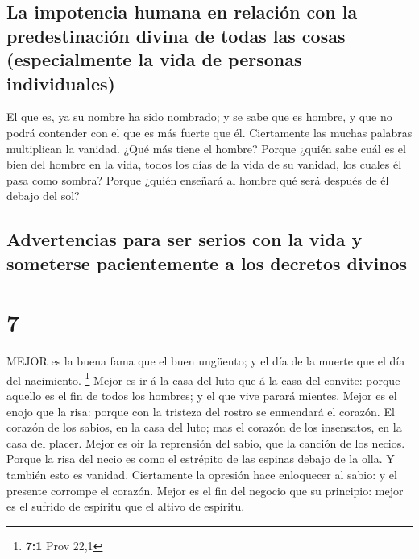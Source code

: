 \hypertarget{la-impotencia-humana-en-relaciuxf3n-con-la-predestinaciuxf3n-divina-de-todas-las-cosas-especialmente-la-vida-de-personas-individuales}{%
\subsection{La impotencia humana en relación con la predestinación
divina de todas las cosas (especialmente la vida de personas
individuales)}\label{la-impotencia-humana-en-relaciuxf3n-con-la-predestinaciuxf3n-divina-de-todas-las-cosas-especialmente-la-vida-de-personas-individuales}}

 El que es, ya su nombre ha sido nombrado; y se sabe que es
hombre, y que no podrá contender con el que es más fuerte que él.
 Ciertamente las muchas palabras multiplican la vanidad.
¿Qué más tiene el hombre?  Porque ¿quién sabe cuál es el
bien del hombre en la vida, todos los días de la vida de su vanidad, los
cuales él pasa como sombra? Porque ¿quién enseñará al hombre qué será
después de él debajo del sol?

\hypertarget{advertencias-para-ser-serios-con-la-vida-y-someterse-pacientemente-a-los-decretos-divinos}{%
\subsection{Advertencias para ser serios con la vida y someterse
pacientemente a los decretos
divinos}\label{advertencias-para-ser-serios-con-la-vida-y-someterse-pacientemente-a-los-decretos-divinos}}

\hypertarget{section-6}{%
\section{7}\label{section-6}}

 MEJOR es la buena fama que el buen ungüento; y el día de la
muerte que el día del nacimiento. \footnote{\textbf{7:1} Prov 22,1}
 Mejor es ir á la casa del luto que á la casa del convite:
porque aquello es el fin de todos los hombres; y el que vive parará
mientes.  Mejor es el enojo que la risa: porque con la
tristeza del rostro se enmendará el corazón.  El corazón de
los sabios, en la casa del luto; mas el corazón de los insensatos, en la
casa del placer.  Mejor es oir la reprensión del sabio, que
la canción de los necios.  Porque la risa del necio es como
el estrépito de las espinas debajo de la olla. Y también esto es
vanidad.  Ciertamente la opresión hace enloquecer al sabio:
y el presente corrompe el corazón.  Mejor es el fin del
negocio que su principio: mejor es el sufrido de espíritu que el altivo
de espíritu.

